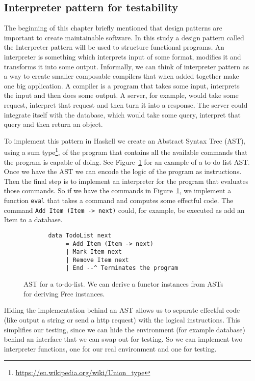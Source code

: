 \subsection{Interpreter pattern for testability}\label{interpreterpattern}

The beginning of this chapter briefly mentioned that design patterns are
important to create maintainable software.  In this study a design pattern
called the Interpreter pattern will be used to structure functional programs. An
interpreter is something which interprets input of some format, modifies it and
transforms it into some output.  Informally, we can think of interpreter pattern
as a way to create smaller composable compilers that when added together make
one big application. A compiler is a program that takes some input, interprets
the input and then does some output. A server, for example, would take some
request, interpret that request and then turn it into a response. The server
could integrate itself with the database, which would take some query, interpret
that query and then return an object.~\cite{interpreterpattern}

To implement this pattern in Haskell we create an Abstract Syntax Tree (AST),
using a sum type\footnote{\url{https://en.wikipedia.org/wiki/Union_type}}, of
the program that contains all the available commands that the program is capable
of doing. See Figure~\ref{freeunion} for an example of a to-do list AST. Once we
have the AST we can encode the logic of the program as instructions. Then the
final step is to implement an interpreter for the program that evaluates those
commands. So if we have the commands in Figure~\ref{freeunion}, we implement a
function \texttt{eval} that takes a command and computes some effectful code.
The command \texttt{Add Item (Item -> next)} could, for example, be executed as
add an Item to a database.

\begin{figure}[H]
    \begin{lstlisting}
       data TodoList next
            = Add Item (Item -> next)
            | Mark Item next
            | Remove Item next
            | End --^ Terminates the program
    \end{lstlisting}
    \caption{AST for a to-do-list. We can derive a functor instances
    from ASTs for deriving Free instances.~\cite{commentarycompiler}}
    \label{freeunion}
\end{figure}


Hiding the implementation behind an AST allows us to separate effectful code
(like output a string or send a http request) with the logical instructions.
This simplifies our testing, since we can hide the environment (for example
database) behind an interface that we can swap out for testing. So we can
implement two interpreter functions, one for our real environment and one for
testing. 

